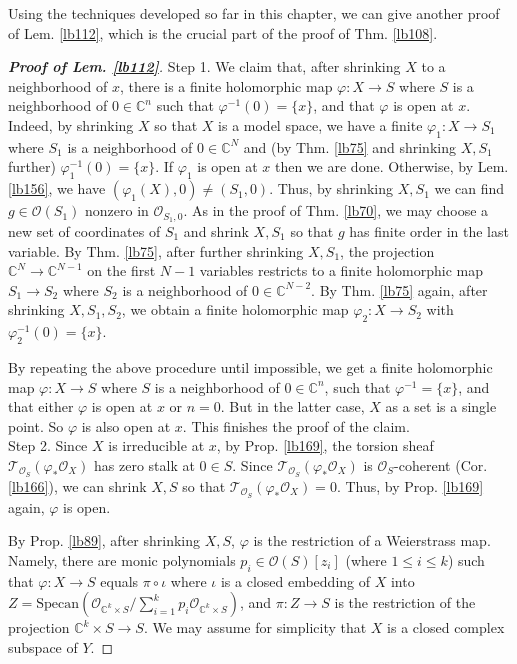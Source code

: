 \documentclass[12pt,b5paper,notitlepage]{report}
\theoremstyle{definition}
\theoremstyle{plain}
\newcommand{\scr}{\mathscr}
\newcommand{\Cbb}{\mathbb C}
\newcommand{\Specan}{\mathrm{Specan}}
\numberwithin{equation}{section}
\begin{document}
Using the techniques developed so far in this chapter, we can give another proof of Lem. \ref{lb112}, which is the crucial part of the proof of Thm. \ref{lb108}.

\begin{proof}[\textbf{Proof of Lem. \ref{lb112}}]
Step 1. We claim that, after shrinking $X$ to a neighborhood of $x$, there is a finite holomorphic map $\varphi:X\rightarrow S$ where $S$ is a neighborhood of $0\in\Cbb^n$ such that $\varphi^{-1}(0)=\{x\}$, and that $\varphi$ is open at $x$. Indeed, by shrinking $X$ so that $X$ is a model space, we have a finite $\varphi_1:X\rightarrow S_1$ where $S_1$ is a neighborhood of $0\in\Cbb^N$ and (by Thm. \ref{lb75} and shrinking $X,S_1$ further) $\varphi_1^{-1}(0)=\{x\}$. If $\varphi_1$ is open at $x$ then we are done. Otherwise, by Lem. \ref{lb156}, we have $(\varphi_1(X),0)\neq(S_1,0)$. Thus, by shrinking $X,S_1$ we can find $g\in\scr O(S_1)$ nonzero in $\scr O_{S_1,0}$. As in the proof of Thm. \ref{lb70}, we may choose a new set of coordinates of $S_1$ and shrink $X,S_1$ so that $g$ has finite order in the last variable. By Thm. \ref{lb75}, after further shrinking $X,S_1$, the projection $\Cbb^N\rightarrow\Cbb^{N-1}$ on the first $N-1$ variables restricts to a finite holomorphic map $S_1\rightarrow S_2$ where $S_2$ is a neighborhood of $0\in\Cbb^{N-2}$. By Thm. \ref{lb75} again, after shrinking $X,S_1,S_2$, we obtain a finite holomorphic map $\varphi_2:X\rightarrow S_2$ with $\varphi_2^{-1}(0)=\{x\}$.

By repeating the above procedure until impossible, we get a finite holomorphic map $\varphi:X\rightarrow S$ where $S$ is a neighborhood of $0\in\Cbb^n$, such that $\varphi^{-1}=\{x\}$, and that either $\varphi$ is open at $x$ or $n=0$. But in the latter case, $X$ as a set is a single point. So $\varphi$ is also open at $x$. This finishes the proof of the claim.\\[-1ex]

Step 2. Since $X$ is irreducible at $x$, by Prop. \ref{lb169}, the torsion sheaf $\scr T_{\scr O_S}(\varphi_*\scr O_X)$ has zero stalk at $0\in S$. Since $\scr T_{\scr O_S}(\varphi_*\scr O_X)$ is $\scr O_S$-coherent (Cor. \ref{lb166}), we can shrink $X,S$ so that $\scr T_{\scr O_S}(\varphi_*\scr O_X)=0$. Thus, by Prop. \ref{lb169} again, $\varphi$ is open.

By Prop. \ref{lb89}, after shrinking $X,S$, $\varphi$ is the restriction of a Weierstrass map. Namely, there are monic polynomials $p_i\in\scr O(S)[z_i]$ (where $1\leq i\leq k$) such that $\varphi:X\rightarrow S$ equals $\pi\circ\iota$ where $\iota$ is a closed embedding of $X$ into $Z=\Specan(\scr O_{\Cbb^k\times S}/\sum_{i=1}^k p_i\scr O_{\Cbb^k\times S})$, and $\pi:Z\rightarrow S$ is the restriction of the projection $\Cbb^k\times S\rightarrow S$. We may assume for simplicity that $X$ is a closed complex subspace of $Y$. 


\end{proof}
\end{document}

